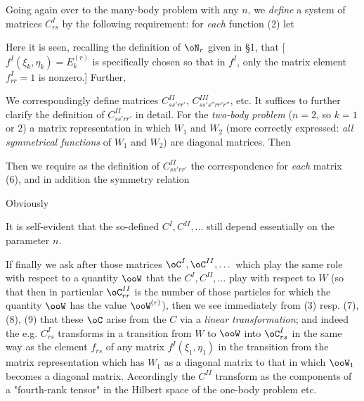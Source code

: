 \begin{paper}{1}
Going again over to the many-body problem with any $n$, we \textit{define} a system of matrices $C_{rs}^I$ by the following requirement: for \textit{each} function (2) let

Here it is seen, recalling the definition of $\oN_r$ given in \S1, that
[$f^I(\xi_k,\eta_k) = E_k^{(r)}$ is specifically chosen so that in $f^I$, only the matrix element $f^I_{rr}=1$ is nonzero.] Further,

We correspondingly define matrices $C^{II}_{ss'rr'}$, $C^{III}_{ss's''rr'r''}$, etc. It suffices to further clarify the definition of $C^{II}_{ss'rr'}$ in detail. For the \textit{two-body problem} ($n=2$, so $k=1$ or $2$) a matrix representation in which $W_1$ and $W_2$ (more correctly expressed: \textit{all symmetrical functions} of $W_1$ and $W_2$) are diagonal matrices. Then

Then we require as the definition of $C^{II}_{ss'rr'}$ the correspondence
for \textit{each} matrix (6), and in addition the symmetry relation

Obviously

It is self-evident that the so-defined $C^I,C^{II},\dots$ still depend essentially on the parameter $n$.

If finally we ask after those matrices $\oC^I, \oC^{II}, \dots$ which play the same role with respect to a quantity $\ooW$ that the $C^I, C^{II}, \dots$ play with respect to $W$ (so that then in particular $\oC^{II}_{rr}$ is the number of those particles for which the quantity $\ooW$ has the value $\ooW^{(r)}$), then we see immediately from (3) resp. (7), (8), (9) that these $\oC$ arise from the $C$ via a \textit{linear transformation}; and indeed the e.g. $C^I_{rs}$ transforms in a transition from $W$ to $\ooW$ into $\oC^I_{rs}$ in the same way as the element $f_{rs}$ of any matrix $f^I(\xi_1,\eta_1)$ in the transition from the matrix representation which has $W_1$ as a diagonal matrix to that in which $\ooW_1$ becomes a diagonal matrix. Accordingly the $C^{II}$ transform as the components of a "fourth-rank tensor" in the Hilbert space of the one-body problem etc.


\end{paper}
